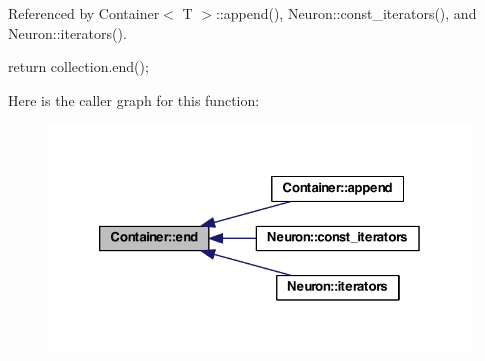 Referenced by Container$<$ T $>$::append(), Neuron::const\_\-iterators(), and Neuron::iterators().


\begin{DoxyCode}
  {
    return collection.end();
  }
\end{DoxyCode}


Here is the caller graph for this function:
\nopagebreak
\begin{figure}[H]
\begin{center}
\leavevmode
\includegraphics[width=326pt]{class_container_a266eabe62963d6909d3aca7f105e203e_icgraph}
\end{center}
\end{figure}


